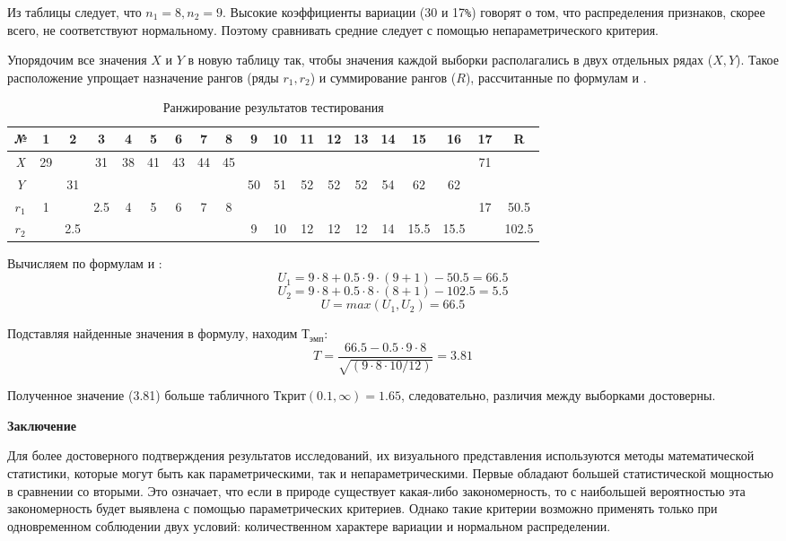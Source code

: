\documentclass[12pt]{article}
\begin{document}
Из таблицы  следует, что $n_1 = 8, n_2 = 9$. Высокие коэффициенты вариации (30 и 17\verb!%!) говорят о том, что распределения признаков, скорее всего, не соответствуют нормальному. Поэтому сравнивать средние следует с помощью непараметрического критерия.

Упорядочим все значения $X$ и $Y$ в новую таблицу  так, чтобы значения каждой выборки располагались в двух отдельных рядах ($X, Y$). Такое расположение упрощает назначение рангов (ряды $r_1, r_2$) и суммирование рангов ($R$), рассчитанные по формулам и .

\begin{table}[h]
    \centering
    \caption{Ранжирование результатов тестирования}
    \bigskip
    \begin{tabular}{|c|c|c|c|c|c|c|c|c|c|c|c|c|c|c|c|c|c|c|} \hline
        \textit{№} &1&2&3&4&5&6&7&8&9&10&11&12&13&14&15&16&17&R \\ \hline
        \textit{X} &29&&31&38&41&43&44&45&&&&&&&&&71&  \\ \hline
        \textit{Y} &&31&&&&&&&50&51&52&52&52&54&62&62&&  \\  \hline
        \textit{$r_1$} &1&&2.5&4&5&6&7&8&&&&&&&&&17&50.5  \\  \hline
        \textit{$r_2$} &&2.5&&&&&&&9&10&12&12&12&14&15.5&15.5&&102.5  \\  \hline
    \end{tabular}
\end{table}

Вычисляем по формулам и :
$$
    U_1 = 9 \cdot 8 + 0.5 \cdot 9 \cdot (9+1) - 50.5 = 66.5
$$
$$
    U_2 = 9 \cdot 8 + 0.5 \cdot 8 \cdot (8+1) - 102.5 = 5.5   
$$
$$
    U = max(U_1, U_2) = 66.5
$$
  
Подставляя найденные значения в формулу, находим $Т_{эмп}$:
$$
    T =\frac{66.5 - 0.5 \cdot 9 \cdot 8}{\sqrt{(9 \cdot 8 \cdot 10/12)}} = 3.81
$$
  
Полученное значение (3.81) больше табличного $Ткрит(0.1, \infty) = 1.65$, следовательно, различия между выборками достоверны.

\medskip
\textbf{Заключение}

\medskip
Для более достоверного подтверждения результатов исследований, их визуального представления используются методы математической статистики, которые могут быть как параметрическими, так и непараметрическими.
Первые обладают большей статистической мощностью в сравнении со вторыми. Это означает, что если в природе существует какая-либо закономерность, то с наибольшей вероятностью эта закономерность будет выявлена с помощью параметрических критериев. Однако такие критерии возможно применять только при одновременном соблюдении двух условий: количественном характере вариации и нормальном распределении.
\end{document}
